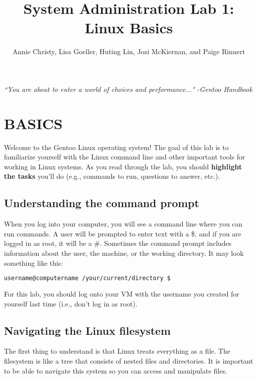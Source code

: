 \documentclass[11pt,a4paper]{article}
\title{System Administration Lab 1: Linux Basics\vspace{-2ex}}
\author{Annie Christy, Lisa Goeller, Huting Lin, Jozi McKiernan, and Paige Rinnert}
\date{}
\begin{document}
\maketitle

\emph{``You are about to enter a world of choices and performance..."}
\newline
\null\hfill\hfill\emph{-Gentoo Handbook}



\section{BASICS}

Welcome to the Gentoo Linux operating system! The goal of this lab is to familiarize yourself with the Linux command line and other important tools for working in Linux systems. As you read through the lab, you should \textbf{highlight the tasks} you'll do (e.g., commands to run, questions to answer, etc.).

\subsection*{Understanding the command prompt}

\indent\indent When you log into your computer, you will see a command line where you can run commands. A user will be prompted to enter text with a \$, and if you are logged in as root, it will be a \#. Sometimes the command prompt includes information about the user, the machine, or the working directory. It may look something like this:

\begin{lstlisting}[basicstyle=\ttfamily, backgroundcolor = \color{lightgray}, language = bash, xleftmargin = 0cm, framexleftmargin = 1em]
username@computername /your/current/directory $
\end{lstlisting}

For this lab, you should log onto your VM with the username you created for yourself last time (i.e., don't log in as root).


\subsection*{Navigating the Linux filesystem}

\indent\indent The first thing to understand is that Linux treats everything as a file. The filesystem is like a tree that consists of nested files and directories. It is important to be able to navigate this system so you can access and manipulate files.
\end{document}
